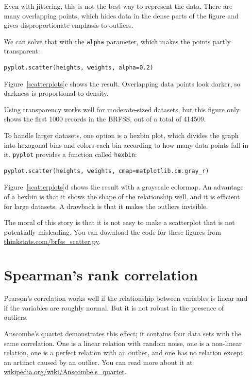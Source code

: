 \documentclass[12pt]{book}
\begin{document}
Even with jittering, this is not the best way to represent the data.
There are many overlapping points, which hides data
in the dense parts of the figure and gives disproportionate emphasis
to outliers.

We can solve that with the {\tt alpha} parameter, which makes
the points partly transparent:
%
\begin{verbatim}
pyplot.scatter(heights, weights, alpha=0.2)
\end{verbatim}
%
Figure~\ref{scatterplots}c shows the result.  Overlapping data points
look darker, so darkness is proportional to density.

Using transparency works well for moderate-sized datasets, but this
figure only shows the first 1000 records in the BRFSS, out of a total
of 414509.

To handle larger datasets, one option is a hexbin plot, which divides
the graph into hexagonal bins and colors each bin according to how many
data points fall in it.  {\tt pyplot} provides a function called 
{\tt hexbin}:
%
\begin{verbatim}
pyplot.scatter(heights, weights, cmap=matplotlib.cm.gray_r)
\end{verbatim}
%
Figure~\ref{scatterplots}d shows the result with a grayscale colormap.
An advantage of a hexbin is that it shows the shape of the relationship
well, and it is efficient for large datasets.  A drawback is that
it makes the outliers invisible.

The moral of this story is that it is
not easy to make a scatterplot that is not potentially misleading.
You can download the code for these figures from
\url{thinkstats.com/brfss_scatter.py}.


\section{Spearman's rank correlation}

Pearson's correlation works well if the relationship between variables
is linear and if the variables are roughly normal.  But it is not
robust in the presence of outliers.

Anscombe's quartet demonstrates this effect; it contains four data
sets with the same correlation.  One is a linear relation with random
noise, one is a non-linear relation, one is a perfect relation with an
outlier, and one has no relation except an artifact caused by an
outlier.  You can read more about it at
\url{wikipedia.org/wiki/Anscombe's_quartet}.
\end{document}
